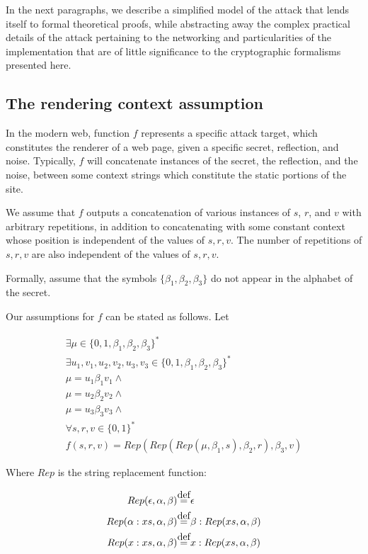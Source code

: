 \documentclass{sig-alternate-05-2015}
\newcommand\defeq{\stackrel{\mathclap{\normalfont\mbox{def}}}{=}}
\begin{document}
In the next paragraphs, we describe a simplified model of the attack that
lends itself to formal theoretical proofs, while abstracting away the complex
practical details of the attack pertaining to the networking and particularities
of the implementation that are of little significance to the cryptographic
formalisms presented here.

\subsection{The rendering context assumption}\label{subsec:rendering}

In the modern web, function $f$ represents a specific attack target, which
constitutes the renderer of a web page, given a specific secret, reflection,
and noise. Typically, $f$ will concatenate instances of the secret, the
reflection, and the noise, between some context strings which constitute the
static portions of the site.

We assume that $f$ outputs a concatenation of various instances of $s$, $r$,
and $v$ with arbitrary repetitions, in addition to concatenating with some
constant context whose position is independent of the values of $s, r, v$.  The
number of repetitions of $s, r, v$ are also independent of the values of $s, r,
v$.

Formally, assume that the symbols $\{\beta_1, \beta_2, \beta_3\}$ do not appear
in the alphabet of the secret.

Our assumptions for $f$ can be stated as follows. Let

\begin{equation*}
\begin{split}
\exists \mu \in \{0, 1, \beta_1, \beta_2, \beta_3\}^*\\
\exists u_1, v_1, u_2, v_2, u_3, v_3 \in \{0, 1, \beta_1, \beta_2, \beta_3\}^*\\
\mu = u_1 \beta_1 v_1 \land\\
\mu = u_2 \beta_2 v_2 \land\\
\mu = u_3 \beta_3 v_3 \land\\
\forall s, r, v \in \{0, 1\}^*\\
f(s, r, v) = Rep(Rep(Rep(\mu, \beta_1, s), \beta_2, r), \beta_3, v)
\end{split}
\end{equation*}

Where $Rep$ is the string replacement function:

\begin{align*}
Rep(\epsilon, \alpha, \beta) &\defeq \epsilon\\
Rep(\alpha:xs, \alpha, \beta) &\defeq \beta:Rep(xs, \alpha, \beta)\\
Rep(x:xs, \alpha, \beta) &\defeq x:Rep(xs, \alpha, \beta)
\end{align*}
\end{document}
